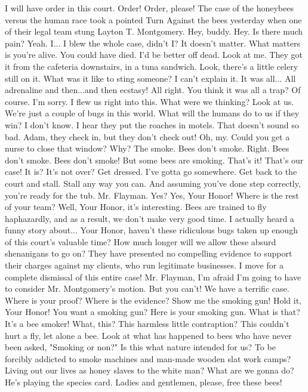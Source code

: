 \documentclass[a4paper,12pt]{article}
\begin{document}
I will have order in this court. Order! Order, please!
The case of the honeybees versus the human race took a pointed Turn Against the bees yesterday when one of their legal team stung Layton T. Montgomery.
Hey, buddy.
Hey.
Is there much pain?
Yeah.
I... I blew the whole case, didn't I?
It doesn't matter. What matters is
you're alive. You could have died.
I'd be better off dead. Look at me.
They got it from the cafeteria downstairs, in a tuna sandwich. Look, there's a little celery still on it.
What was it like to sting someone?
I can't explain it. It was all... All adrenaline and then...and then ecstasy!
All right.
You think it was all a trap?
Of course. I'm sorry. I flew us right into this.
What were we thinking? Look at us. We're just a couple of bugs in this world.
What will the humans do to us if they win?
I don't know.
I hear they put the roaches in motels. That doesn't sound so bad.
Adam, they check in, but they don't check out!
Oh, my.
Could you get a nurse to close that window?
Why?
The smoke.
Bees don't smoke.
Right. Bees don't smoke.
Bees don't smoke!
But some bees are smoking.
That's it! That's our case!
It is? It's not over?
Get dressed. I've gotta go somewhere.
Get back to the court and stall. Stall any way you can.
And assuming you've done step correctly, you're ready for the tub.
Mr. Flayman.
Yes? Yes, Your Honor!
Where is the rest of your team?
Well, Your Honor, it's interesting. Bees are trained to fly haphazardly, and as a result, we don't make very good time.
I actually heard a funny story about...
Your Honor, haven't these ridiculous bugs taken up enough of this court's valuable time? How much longer will we allow these absurd shenanigans to go on?
They have presented no compelling evidence to support their charges against my clients, who run legitimate businesses.
I move for a complete dismissal of this entire case!
Mr. Flayman, I'm afraid I'm going to have to consider Mr. Montgomery's motion.
But you can't! We have a terrific case.
Where is your proof?
Where is the evidence?
Show me the smoking gun!
Hold it, Your Honor!
You want a smoking gun? Here is your smoking gun.
What is that?
It's a bee smoker!
What, this? This harmless little contraption? This couldn't hurt a fly, let alone a bee.
Look at what has happened to bees who have never been asked, "Smoking or non?" Is this what nature intended for us? To be forcibly addicted to smoke machines and man-made wooden slat work camps?
Living out our lives as honey slaves to the white man?
What are we gonna do?
He's playing the species card.
Ladies and gentlemen, please, free these bees!
\end{document}
